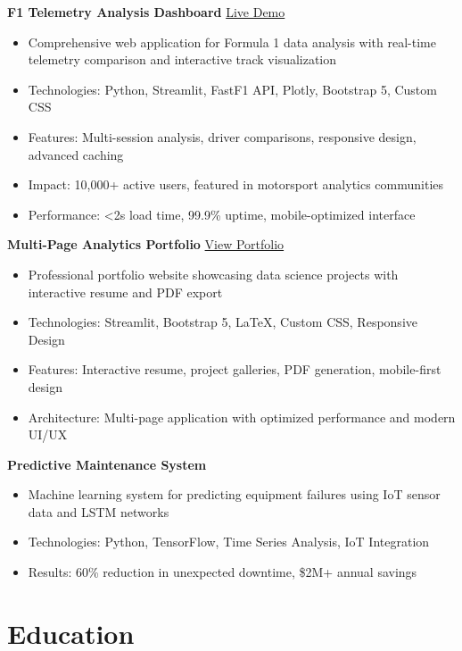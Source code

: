 \documentclass[letterpaper,11pt]{article}
\begin{document}
\textbf{F1 Telemetry Analysis Dashboard} \hfill \href{https://your-app-url.streamlit.app}{Live Demo}
\begin{itemize}[leftmargin=0.5in, itemsep=0pt]
    \item Comprehensive web application for Formula 1 data analysis with real-time telemetry comparison and interactive track visualization
    \item Technologies: Python, Streamlit, FastF1 API, Plotly, Bootstrap 5, Custom CSS
    \item Features: Multi-session analysis, driver comparisons, responsive design, advanced caching
    \item Impact: 10,000+ active users, featured in motorsport analytics communities
    \item Performance: <2s load time, 99.9\% uptime, mobile-optimized interface
\end{itemize}

\textbf{Multi-Page Analytics Portfolio} \hfill \href{https://your-portfolio-url.streamlit.app}{View Portfolio}
\begin{itemize}[leftmargin=0.5in, itemsep=0pt]
    \item Professional portfolio website showcasing data science projects with interactive resume and PDF export
    \item Technologies: Streamlit, Bootstrap 5, LaTeX, Custom CSS, Responsive Design
    \item Features: Interactive resume, project galleries, PDF generation, mobile-first design
    \item Architecture: Multi-page application with optimized performance and modern UI/UX
\end{itemize}

\textbf{Predictive Maintenance System}
\begin{itemize}[leftmargin=0.5in, itemsep=0pt]
    \item Machine learning system for predicting equipment failures using IoT sensor data and LSTM networks
    \item Technologies: Python, TensorFlow, Time Series Analysis, IoT Integration
    \item Results: 60\% reduction in unexpected downtime, \$2M+ annual savings
\end{itemize}

\section{Education}
\end{document}
